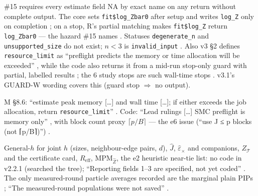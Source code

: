 \begin{divergence}
\#15 requires every estimate field NA by exact name on any return without complete output. The core sets
\texttt{fit\$log\_Zbar0} after setup  and
writes \texttt{log\_Z} only on completion ; on a
stop, R's partial matching makes \texttt{fit\$log\_Z} return \texttt{log\_Zbar0} --- the hazard \#15 names
. Statuses \texttt{degenerate\_n} and \texttt{unsupported\_size} do not
exist; $n<3$ is \texttt{invalid\_input} .
Also v3 \S2 defines \texttt{resource\_limit} as ``preflight predicts the memory or time allocation will be exceeded''
, while the code also returns it from a mid-run stop-only guard with partial,
labelled results ; the 6 study stops are such
wall-time stops . v3.1's GUARD-W wording covers this (guard stop
$\Rightarrow$ no output).
\end{divergence}

\begin{divergence}
M \S8.6: ``estimate peak memory [\dots] and wall time [\dots]; if either exceeds the job allocation, return
\texttt{resource\_limit}'' . Code: ``Lead rulings [\dots] SMC preflight is memory
only'' , with block count proxy
$\lceil p/B\rceil$  --- the e6 issue (``use J ≤ p
blocks (not ⌈p/B⌉)'') .
\end{divergence}

\begin{divergence}
General-$h$ for joint $h$ (sizes, neighbour-edge pairs, $d$), $\hat J$, $\hat\varepsilon_\times$ and companions, $Z_{\mathcal T}$ and the
certificate card, $R_{\mathrm{eff}}$, $\mathrm{MPM}_{\hat Z}$, the e2 heuristic near-tie list: no code in v2.2.1 (searched the tree);
``Reporting fields 1--3 are specified, not yet coded'' . The only
measured-round particle averages recorded are the marginal plain PIPs
; ``The measured-round populations were
not saved'' .
\end{divergence}

